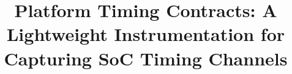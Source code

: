 \documentclass[conference]{IEEEtran}
\begin{document}
\newcommand{\para}[1]{\vspace*{0.3\baselineskip}\noindent\textbf{#1.}}

\newcommand{\Pic}{Platform timing contract\xspace}
\newcommand{\pic}{platform timing contract\xspace}
\newcommand{\Pics}{Platform timing contracts\xspace}
\newcommand{\pics}{platform timing contracts\xspace}
\newcommand{\pici}{platform timing contract instrumentation\xspace}
\newcommand{\Pici}{Platform timing contract instrumentation\xspace}
\newcommand{\PICI}{PTCI\xspace}
\newcommand{\PICIs}{PTCIs\xspace}
\newcommand{\ucfi}{$\mu$CFI\xspace}

\title{Platform Timing Contracts: A Lightweight Instrumentation for Capturing SoC Timing Channels}

\end{document}
